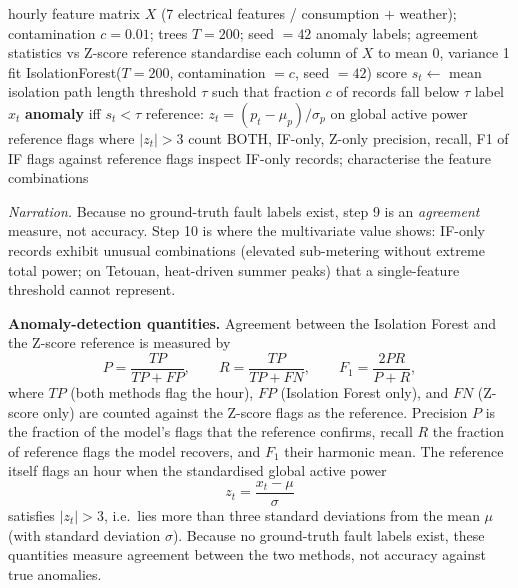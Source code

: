 \documentclass[11pt,a4paper]{article}
\begin{document}
\begin{algorithm}[H]
\caption{Multivariate anomaly detection with the Isolation Forest and the agreement study against the Z-score reference.}
\label{alg:iforest}
\begin{algorithmic}[1]
\Require hourly feature matrix $X$ (7 electrical features / consumption $+$
weather); contamination $c = 0.01$; trees $T = 200$; seed $= 42$
\Ensure anomaly labels; agreement statistics vs Z-score reference
\State standardise each column of $X$ to mean 0, variance 1
\State fit IsolationForest($T{=}200$, contamination $=c$, seed $=42$)
 \State score $s_t \gets$ mean isolation path length \EndFor
\State threshold $\tau$ such that fraction $c$ of records fall below $\tau$
\State label $x_t$ \textbf{anomaly} iff $s_t < \tau$ 
\State reference: $z_t = (p_t - \mu_p)/\sigma_p$ on global active power
\State reference flags where $|z_t| > 3$ 
\State count BOTH, IF-only, Z-only 
\State precision, recall, F1 of IF flags against reference flags
\State inspect IF-only records; characterise the feature combinations
\end{algorithmic}
\end{algorithm}
\noindent\textit{Narration.} Because no ground-truth fault labels exist, step 9
is an \emph{agreement} measure, not accuracy. Step 10 is where the multivariate
value shows: IF-only records exhibit unusual combinations (elevated sub-metering
without extreme total power; on Tetouan, heat-driven summer peaks) that a
single-feature threshold cannot represent.

\noindent\textbf{Anomaly-detection quantities.} Agreement between the
Isolation Forest and the Z-score reference is measured by
\begin{equation}
P=\frac{TP}{TP+FP},\qquad R=\frac{TP}{TP+FN},\qquad F_1=\frac{2PR}{P+R},
\end{equation}
where $TP$ (both methods flag the hour), $FP$ (Isolation Forest only), and $FN$
(Z-score only) are counted against the Z-score flags as the reference. Precision
$P$ is the fraction of the model's flags that the reference confirms, recall $R$
the fraction of reference flags the model recovers, and $F_1$ their harmonic
mean. The reference itself flags an hour when the standardised global active
power
\begin{equation}
z_t=\frac{x_t-\mu}{\sigma}
\end{equation}
satisfies $\lvert z_t\rvert>3$, i.e.\ lies more than three standard deviations
from the mean $\mu$ (with standard deviation $\sigma$). Because no ground-truth
fault labels exist, these quantities measure agreement between the two methods,
not accuracy against true anomalies.
\end{document}
